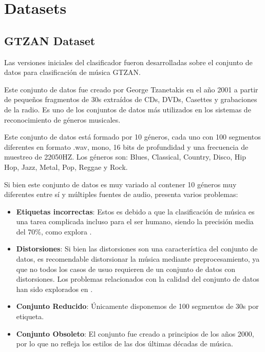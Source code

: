 
\section{Datasets}\label{datasets}

\hypertarget{gtzan-dataset}{%
\subsection{GTZAN Dataset}\label{gtzan-dataset}}

Las versiones iniciales del clasificador fueron desarrolladas sobre el
conjunto de datos para clasificación de música GTZAN.

Este conjunto de datos \cite{gtzan_paper} fue creado por George Tzanetakis en el año 2001 a
partir de pequeños fragmentos de 30s extraídos de CDs, DVDs, Casettes y
grabaciones de la radio. Es uno de los conjuntos de datos más utilizados
en los sistemas de reconocimiento de géneros musicales.

Este conjunto de datos está formado por 10 géneros, cada uno con 100
segmentos diferentes en formato .wav, mono, 16 bits de profundidad y una
frecuencia de muestreo de 22050HZ. Los géneros son: Blues, Classical, Country, Disco, Hip Hop, Jazz, Metal, Pop, Reggae y Rock.

Si bien este conjunto de datos es muy variado al contener 10 géneros muy diferentes entre sí y múltiples fuentes de audio, presenta varios problemas:

\begin{itemize}
\itemsep0em
\item
  \textbf{Etiquetas incorrectas}: Estos es debido a que la clasificación
  de música es una tarea complicada incluso para el ser humano, siendo
  la precisión media del 70\%, como explora \cite{cnn_vs_human_acc_music}.
\item
  \textbf{Distorsiones}: Si bien las distorsiones son una característica
  del conjunto de datos, es recomendable distorsionar la música mediante
  preprocesamiento, ya que no todos los casos de usuo requieren de un conjunto de 
  datos con distorsiones. Los problemas relacionados 
  con la calidad del conjunto de datos han sido explorados en \cite{gtzan_analysis}.
\item
  \textbf{Conjunto Reducido}: Únicamente disponemos de 100 segmentos de
  30s por etiqueta.
\item
  \textbf{Conjunto Obsoleto}: El conjunto fue creado a principios de los
  años 2000, por lo que no refleja los estilos de las dos últimas décadas de música.
\end{itemize}


